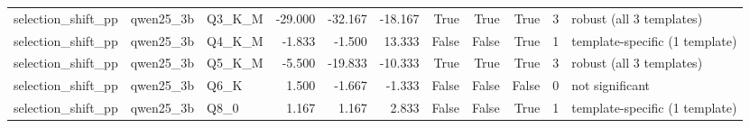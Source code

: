 \begin{tabular}{lllrrrrrrrl}
selection\_shift\_pp & qwen25\_3b & Q3\_K\_M & -29.000 & -32.167 & -18.167 & True & True & True & 3 & robust (all 3 templates) \\
selection\_shift\_pp & qwen25\_3b & Q4\_K\_M & -1.833 & -1.500 & 13.333 & False & False & True & 1 & template-specific (1 template) \\
selection\_shift\_pp & qwen25\_3b & Q5\_K\_M & -5.500 & -19.833 & -10.333 & True & True & True & 3 & robust (all 3 templates) \\
selection\_shift\_pp & qwen25\_3b & Q6\_K & 1.500 & -1.667 & -1.333 & False & False & False & 0 & not significant \\
selection\_shift\_pp & qwen25\_3b & Q8\_0 & 1.167 & 1.167 & 2.833 & False & False & True & 1 & template-specific (1 template) \\
\bottomrule
\end{tabular}
